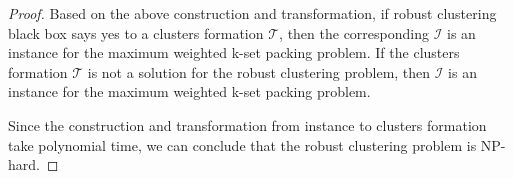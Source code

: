 \documentclass[times]{ettauth}
\newcommand{\ie}{i.e., }
\theoremstyle{mytheoremstyle}
\theoremstyle{mytheoremstyle}
\theoremstyle{mytheoremstyle}
\begin{document}
\begin{proof}
Based on the above construction and transformation, if robust clustering black box says yes to a clusters formation $\mathcal{T}$, then the corresponding $\mathcal{I}$ is an instance for the maximum weighted k-set packing problem.
If the clusters formation $\mathcal{T}$ is not a solution for the robust clustering problem, then $\mathcal{I}$ is an instance for the maximum weighted k-set packing problem.

Since the construction and transformation from instance to clusters formation take polynomial time, we can conclude that the robust clustering problem is NP-hard.

\end{proof}
\end{document}
